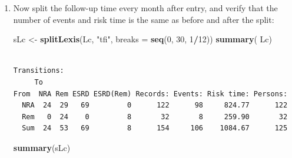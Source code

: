 \documentclass[
]{book}
\newenvironment{Shaded}{\begin{snugshade}}{\end{snugshade}}
\newcommand{\AttributeTok}[1]{\textcolor[rgb]{0.13,0.29,0.53}{#1}}
\newcommand{\DecValTok}[1]{\textcolor[rgb]{0.00,0.00,0.81}{#1}}
\newcommand{\FunctionTok}[1]{\textcolor[rgb]{0.13,0.29,0.53}{\textbf{#1}}}
\newcommand{\NormalTok}[1]{#1}
\newcommand{\OtherTok}[1]{\textcolor[rgb]{0.56,0.35,0.01}{#1}}
\newcommand{\SpecialCharTok}[1]{\textcolor[rgb]{0.81,0.36,0.00}{\textbf{#1}}}
\newcommand{\StringTok}[1]{\textcolor[rgb]{0.31,0.60,0.02}{#1}}
\begin{document}
\begin{enumerate}
\begin{verbatim}
Concordance= 0.664  (se = 0.033 )
Likelihood ratio test= 30.31  on 3 df,   p=1e-06
Wald test            = 27.07  on 3 df,   p=6e-06
Score (logrank) test = 29.41  on 3 df,   p=2e-06
\end{verbatim}

  What is the effect of of remission on the rate of ESRD?

  \section{Splitting the follow-up time}\label{splitting-the-follow-up-time}

  In order to explore the effect of remission on the rate of ESRD, we
  split the data further into small pieces of follow-up. To this
  end we use the function \texttt{splitLexis}. The rates can then be
  modeled using a Poisson-model, and the shape of the effect of the
  underlying \emph{rates} be explored. Furthermore, we can allow effects of both
  time since NRA and current age. To this end we will use splines, so we
  need the \texttt{splines} and also the \texttt{mgcv} packages.
\item
  Now split the follow-up time every month after entry, and verify
  that the number of events and risk time is the same as before and
  after the split:

\begin{Shaded}
\begin{Highlighting}[]
\NormalTok{sLc }\OtherTok{\textless{}{-}} \FunctionTok{splitLexis}\NormalTok{(Lc, }\StringTok{"tfi"}\NormalTok{, }\AttributeTok{breaks =} \FunctionTok{seq}\NormalTok{(}\DecValTok{0}\NormalTok{, }\DecValTok{30}\NormalTok{, }\DecValTok{1}\SpecialCharTok{/}\DecValTok{12}\NormalTok{))}
\FunctionTok{summary}\NormalTok{( Lc)}
\end{Highlighting}
\end{Shaded}

\begin{verbatim}

Transitions:
     To
From  NRA Rem ESRD ESRD(Rem) Records: Events: Risk time: Persons:
  NRA  24  29   69         0      122      98     824.77      122
  Rem   0  24    0         8       32       8     259.90       32
  Sum  24  53   69         8      154     106    1084.67      125
\end{verbatim}

\begin{Shaded}
\begin{Highlighting}[]
\FunctionTok{summary}\NormalTok{(sLc)}
\end{Highlighting}
\end{Shaded}


\end{enumerate}
\end{document}
